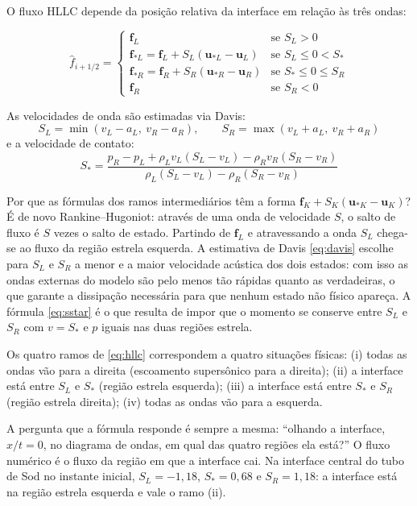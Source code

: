\documentclass[10pt,a4paper]{article}
\newcommand{\fh}{\hat f}
\newcommand{\vu}{\mathbf{u}}
\newcommand{\vf}{\mathbf{f}}
\begin{document}
O fluxo HLLC depende da posição relativa da interface em relação às três ondas:
\begin{destaque}
\begin{equation}\label{eq:hllc}
\fh_{i+1/2}=
\begin{cases}
\vf_L & \text{se } S_L>0\\
\vf_{*L}=\vf_L+S_L(\vu_{*L}-\vu_L) & \text{se } S_L\le0<S_*\\
\vf_{*R}=\vf_R+S_R(\vu_{*R}-\vu_R) & \text{se } S_*\le0\le S_R\\
\vf_R & \text{se } S_R<0
\end{cases}
\end{equation}
\end{destaque}
As velocidades de onda são estimadas via Davis:
\begin{equation}\label{eq:davis}
S_L=\min(v_L-a_L,\ v_R-a_R),\qquad S_R=\max(v_L+a_L,\ v_R+a_R)
\end{equation}
e a velocidade de contato:
\begin{equation}\label{eq:sstar}
S_*=\frac{p_R-p_L+\rho_Lv_L(S_L-v_L)-\rho_Rv_R(S_R-v_R)}{\rho_L(S_L-v_L)-\rho_R(S_R-v_R)}
\end{equation}

Por que as fórmulas dos ramos intermediários têm a forma $\vf_K+S_K(\vu_{*K}-\vu_K)$? É de novo Rankine--Hugoniot: através de uma onda de velocidade $S$, o salto de fluxo é $S$ vezes o salto de estado. Partindo de $\vf_L$ e atravessando a onda $S_L$ chega-se ao fluxo da região estrela esquerda. A estimativa de Davis \eqref{eq:davis} escolhe para $S_L$ e $S_R$ a menor e a maior velocidade acústica dos dois estados: com isso as ondas externas do modelo são pelo menos tão rápidas quanto as verdadeiras, o que garante a dissipação necessária para que nenhum estado não físico apareça. A fórmula \eqref{eq:sstar} é o que resulta de impor que o momento se conserve entre $S_L$ e $S_R$ com $v=S_*$ e $p$ iguais nas duas regiões estrela.

\begin{intuicao}
Os quatro ramos de \eqref{eq:hllc} correspondem a quatro situações físicas: (i) todas as ondas vão para a direita (escoamento supersônico para a direita); (ii) a interface está entre $S_L$ e $S_*$ (região estrela esquerda); (iii) a interface está entre $S_*$ e $S_R$ (região estrela direita); (iv) todas as ondas vão para a esquerda.

A pergunta que a fórmula responde é sempre a mesma: ``olhando a interface, $x/t=0$, no diagrama de ondas, em qual das quatro regiões ela está?'' O fluxo numérico é o fluxo da região em que a interface cai. Na interface central do tubo de Sod no instante inicial, $S_L=-1{,}18$, $S_*=0{,}68$ e $S_R=1{,}18$: a interface está na região estrela esquerda e vale o ramo (ii).
\end{intuicao}
\end{document}
